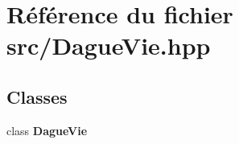 \section{Référence du fichier src/\-Dague\-Vie.hpp}
\label{_dague_vie_8hpp}
\subsection*{Classes}
\begin{DoxyCompactItemize}
\item 
class {\bf Dague\-Vie}
\end{DoxyCompactItemize}
